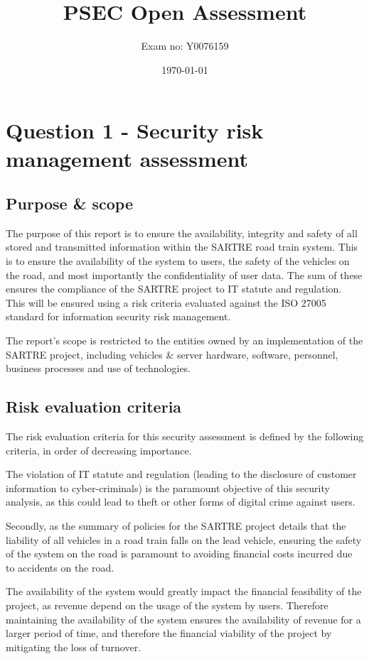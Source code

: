 \documentclass[british,11pt,a4paper]{article}
\begin{document}
\title{PSEC Open Assessment}
\author{Exam no: Y0076159}
\date{\today}
\maketitle
\tableofcontents
\clearpage

\section{Question 1 - Security risk management assessment}
\subsection{Purpose \& scope}
\label{subsec:purpose_scope}
The purpose of this report is to ensure the availability, integrity and safety of all stored and transmitted information within the SARTRE road train system. This is to ensure the availability of the system to users, the safety of the vehicles on the road, and most importantly the confidentiality of user data. The sum of these ensures the compliance of the SARTRE project to IT statute and regulation. This will be ensured using a risk criteria evaluated against the ISO 27005  standard \cite{Iso2005-nn} for information security risk management. 

The report's scope is restricted to the entities owned by an implementation of the SARTRE project, including vehicles \& server hardware, software, personnel, business processes and use of technologies. 

\subsection{Risk evaluation criteria}
The risk evaluation criteria for this security assessment is defined by the following criteria, in order of decreasing importance.

The violation of IT statute and regulation (leading to the disclosure of customer information to cyber-criminals) is the paramount objective of this security analysis, as this could lead to theft or other forms of digital crime against users. 

Secondly, as the summary of policies for the SARTRE project \cite{Davila2013-cy} details that the liability of all vehicles in a road train falls on the lead vehicle, ensuring the safety of the system on the road is paramount to avoiding financial costs incurred due to accidents on the road. 

The availability of the system would greatly impact the financial feasibility of the project, as revenue depend on the usage of the system by users. Therefore maintaining the availability of the system ensures the availability of revenue for a larger period of time, and therefore the financial viability of the project by mitigating the loss of turnover.
\end{document}
